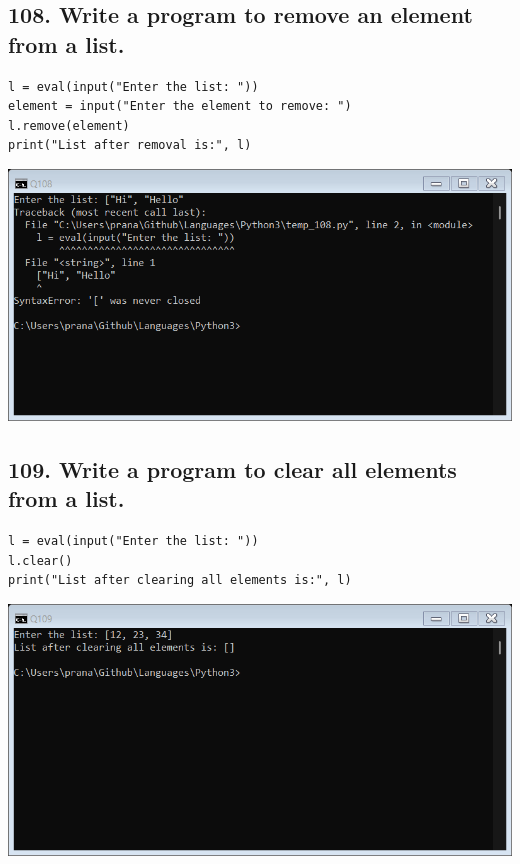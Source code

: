 \documentclass[12pt]{article}
\begin{document}
\subsection*{108. Write a program to remove an element from a list.}
\begin{verbatim}
l = eval(input("Enter the list: "))
element = input("Enter the element to remove: ")
l.remove(element)
print("List after removal is:", l)
\end{verbatim}
\includegraphics[width=\linewidth]{images/108.png}

\subsection*{109. Write a program to clear all elements from a list.}
\begin{verbatim}
l = eval(input("Enter the list: "))
l.clear()
print("List after clearing all elements is:", l)
\end{verbatim}
\includegraphics[width=\linewidth]{images/109.png}
\end{document}
